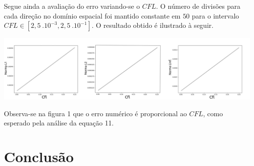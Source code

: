 \documentclass[a0,portrait]{a0poster}
\begin{document}
\begin{minipage}[c]{\linewidth}
\begin{framed}
\begin{multicols}{2}
%		
%		
%		
%		
%		
%		
%		
%		
%		
%	

Segue ainda a avaliação do erro variando-se o $CFL$. O número de divisões para cada direção no domínio espacial foi mantido constante em $50$ para o intervalo $CFL \in [2,5 \ .10^{-3} , 2,5 \ .10^{-1}]$. O resultado obtido é ilustrado à seguir.
\begin{center}
	\includegraphics[width=1\linewidth]{NormaL1.png}
	\label{fig:erro}
\end{center}
Observa-se na figura 1 que o erro numérico é proporcional ao $CFL$, como esperado pela análise da equação 11.
\section*{Conclusão}


\end{multicols}
\end{framed}
\end{minipage}
\end{document}
